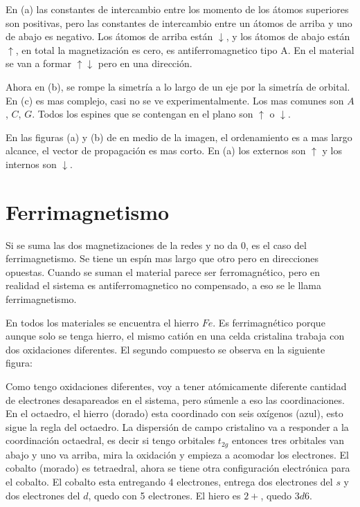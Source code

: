 \documentclass[11pt,fleqn]{book}
\begin{document}

En (a) las constantes de intercambio entre los momento de los átomos superiores son positivas, pero las constantes de intercambio entre un átomos de arriba y uno de abajo es negativo. Los átomos de arriba están $\downarrow$, y los átomos de abajo están $\uparrow$, en total la magnetización es cero, es antiferromagnetico tipo A. En el material se van a formar $\uparrow\downarrow$ pero en una dirección.

Ahora en (b), se rompe la simetría a lo largo de un eje por la simetría de orbital. En (c) es mas complejo, casi no se ve experimentalmente. Los mas comunes son $A$, $C$, $G$. Todos los espines que se contengan en el plano son $\uparrow$ o $\downarrow$.

En las figuras (a) y (b) de en medio de la imagen, el ordenamiento es a mas largo alcance, el vector de propagación es mas corto. En (a) los externos son $\uparrow$ y los internos son $\downarrow$.


\section{Ferrimagnetismo}

Si se suma las dos magnetizaciones de la redes y no da 0, es el  caso del ferrimagnetismo. Se tiene un espín mas largo que otro pero en direcciones opuestas. Cuando se suman el material parece ser ferromagnético, pero en realidad el sistema es antiferromagnetico no compensado, a eso se le llama ferrimagnetismo. 




En todos los materiales se encuentra el hierro $Fe$. Es ferrimagnético porque aunque solo se tenga hierro, el mismo catión en una celda cristalina trabaja con dos oxidaciones diferentes. El segundo compuesto se observa en la siguiente figura:


Como tengo oxidaciones diferentes, voy a tener atómicamente diferente cantidad de electrones desapareados en el sistema, pero súmenle a eso las coordinaciones. En el octaedro, el hierro (dorado) esta coordinado con seis oxígenos (azul), esto sigue la regla del octaedro. La dispersión de campo cristalino va a responder a la coordinación octaedral, es decir si tengo orbitales $t_{2g}$ entonces tres orbitales van abajo y uno va arriba, mira la oxidación y empieza a acomodar los electrones. El cobalto (morado) es tetraedral, ahora se tiene otra configuración electrónica para el cobalto. El cobalto esta entregando 4 electrones, entrega dos electrones del $s$ y dos electrones del $d$, quedo con 5 electrones. El hiero es $2+$, quedo $3d{6}$. 
\end{document}
